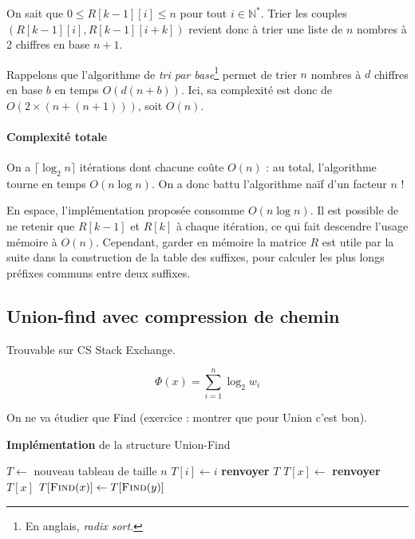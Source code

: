 \documentclass[a4paper, 11pt]{article}
\def\N{\mathbb{N}}
\begin{document}
On sait que $0 \leq R[k-1][i] \leq n$ pour tout $i \in \N^*$. Trier les couples
$(R[k-1][i], R[k-1][i+k])$ revient donc à trier une liste de $n$ nombres à 2
chiffres en base $n+1$.

Rappelons que l'algorithme de \emph{tri par base}\footnote{En anglais,
  \emph{radix sort}.} permet de trier $n$ nombres à $d$ chiffres en base $b$ en
temps $O(d(n+b))$. Ici, sa complexité est donc de $O(2 \times (n + (n+1)))$,
soit $O(n)$.

\paragraph{Complexité totale}

On a $\lceil \log_2 n \rceil$ itérations dont chacune coûte $O(n)$ : au total,
l'algorithme tourne en temps $O(n \log n)$. On a donc battu l'algorithme naïf
d'un facteur $n$ !

En espace, l'implémentation proposée consomme $O(n \log n)$. Il est possible de
ne retenir que $R[k-1]$ et $R[k]$ à chaque itération, ce qui fait descendre
l'usage mémoire à $O(n)$. Cependant, garder en mémoire la matrice $R$ est utile
par la suite dans la construction de la table des suffixes, pour calculer les
plus longs préfixes communs entre deux suffixes.


\newpage



\subsection{Union-find avec compression de chemin}

Trouvable sur CS Stack Exchange.

\[ \Phi(x) = \sum_{i=1}^n \log_2 w_i \]

On ne va étudier que Find (exercice : montrer que pour Union c'est bon).

\begin{algorithm}
\caption*{\textbf{Implémentation} de la structure Union-Find}
\begin{algorithmic}
\State $T \gets $ nouveau tableau de taille $n$
\State $T[i] \gets i$
\EndFor
\State \textbf{renvoyer} $T$
\EndProcedure
{}
$T[x] \gets $ 
\EndIf
\State \textbf{renvoyer} $T[x]$
\EndProcedure
{}
\State $T[\text{\Call{Find}{$x$}}] \gets T[\text{\Call{Find}{$y$}}]$
\EndProcedure
\end{algorithmic}
\end{algorithm}
\end{document}
